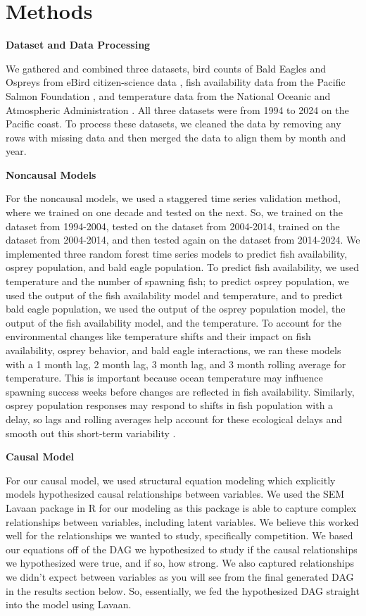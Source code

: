 \documentclass{article}
\begin{document}
\section{Methods}
\textbf{Dataset and Data Processing}

We gathered and combined three datasets, bird counts of Bald Eagles and Ospreys from eBird citizen-science data \cite{5}, fish availability data from the Pacific Salmon Foundation \cite{b2}, and temperature data from the National Oceanic and Atmospheric Administration \cite{b4}. All three datasets were from 1994 to 2024 on the Pacific coast. To process these datasets, we cleaned the data by removing any rows with missing data and then merged the data to align them by month and year.

\textbf{Noncausal Models}

For the noncausal models, we used a staggered time series validation method, where we trained on one decade and tested on the next. So, we trained on the dataset from 1994-2004, tested on the dataset from 2004-2014, trained on the dataset from 2004-2014, and then tested again on the dataset from 2014-2024. We implemented three random forest time series models to predict fish availability, osprey population, and bald eagle population. To predict fish availability, we used temperature and the number of spawning fish; to predict osprey population, we used the output of the fish availability model and temperature, and to predict bald eagle population, we used the output of the osprey population model, the output of the fish availability model, and the temperature. To account for the environmental changes like temperature shifts and their impact on fish availability, osprey behavior, and bald eagle interactions, we ran these models with a 1 month lag, 2 month lag, 3 month lag, and 3 month rolling average for temperature. This is important because ocean temperature may influence spawning success weeks before changes are reflected in fish availability. Similarly, osprey population responses may respond to shifts in fish population with a delay, so lags and rolling averages help account for these ecological delays and smooth out this short-term variability \cite{b6}. 

\textbf{Causal Model}

For our causal model, we used structural equation modeling which explicitly models hypothesized causal relationships between variables. We used the SEM Lavaan package in R for our modeling as this package is able to capture complex relationships between variables, including latent variables. We believe this worked well for the relationships we wanted to study, specifically competition. We based our equations off of the DAG we hypothesized to study if the causal relationships we hypothesized were true, and if so, how strong. We also captured relationships we didn’t expect between variables as you will see from the final generated DAG in the results section below. So, essentially, we fed the hypothesized DAG straight into the model using Lavaan. 
\end{document}
